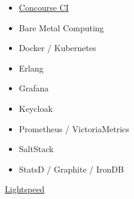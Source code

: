 \documentclass[10pt,letterpaper]{article}
\begin{document}
{{{\begin{multicols}{3}
\begin{itemize}[left=0pt, labelsep=0.5em, itemindent=0pt, listparindent=\parindent, nosep]
          \item \href{https://concourse.ci/}{Concourse CI}
          \item Bare Metal Computing
          \item Docker / Kubernetes
          \item Erlang
          \item Grafana
          \item Keycloak
          \item Prometheus / VictoriaMetrics
          \item SaltStack
          \item StatsD / Graphite / IronDB
        \end{itemize}
      \end{multicols}
    }
  }
}

\vspace{1em}
\headedsection
  {\href{https://www.lightspeedhq.com}{Lightspeed}}
\end{document}
